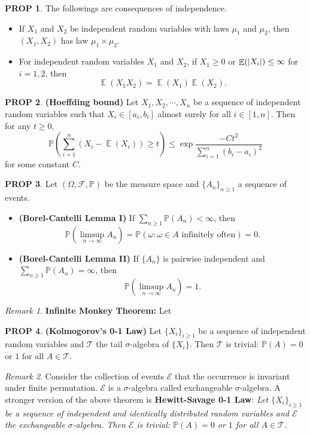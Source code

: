\documentclass[hidelinks,11pt]{article}
\theoremstyle{definition}
\theoremstyle{dotless}
\newtheorem{prop}{PROP}[section]
\theoremstyle{remark}
\newtheorem*{remark}{Remark}
\DeclareMathOperator{\E}{\mathbb{E}}
\DeclareMathOperator{\1}{\mathbf{1}}
\begin{document}
\begin{prop}
The followings are consequences of independence.\begin{itemize}
    \item If $X_1$ and $X_2$ be independent random variables with laws $\mu_1$ and $\mu_2$, then $(X_1,X_2)$ has law $\mu_1\times\mu_2$.
    \item For independent random variables $X_1$ and $X_2$, if $X_1\geq0$ or $\E(\abs{X_i})\leq\infty$ for $i=1,2$, then
    \[\E(X_1X_2)=\E(X_1)\E(X_2).\]
\end{itemize}
\end{prop}

\begin{prop}\textup{\textbf{(Hoeffding bound)}} Let $X_1,X_2,\cdots,X_n$ be a sequence of independent random variables such that $X_i\in[a_i,b_i]$ almost surely for all $i\in[1,n]$. Then for any $t\geq0$,
\[\mathbb{P}\left(\sum_{i=1}^n(X_i-\E(X_i))\geq t\right)\leq\exp{\frac{-Ct^2}{\sum_{i=1}^n(b_i-a_i)^2}}\]
for some constant $C$.
\end{prop}

\begin{prop}Let $(\Omega,\mathcal{F},\mathbb{P})$ be the measure space and $\{A_n\}_{n\geq1}$ a sequence of events.\begin{itemize}
    \item\textup{\textbf{(Borel-Cantelli Lemma I)}} If $\sum_{n\geq1}\mathbb{P}(A_n)<\infty$, then
\[\mathbb{P}(\limsup_{n\to\infty}A_n)=\mathbb{P}(\omega:\omega\in A\textrm{ infinitely often})=0.\]
    \item\textup{\textbf{(Borel-Cantelli Lemma II)}} If $\{A_n\}$ is pairwise independent and $\sum_{n\geq1}\mathbb{P}(A_n)=\infty$, then
    \[\mathbb{P}(\limsup_{n\to\infty}A_n)=1.\]
\end{itemize}
\end{prop}

\begin{remark}\textup{\textbf{Infinite Monkey Theorem:}} Let
\end{remark}

\begin{prop}\textup{\textbf{(Kolmogorov's 0-1 Law)}} Let $\{X_i\}_{i\geq1}$ be a sequence of independent random variables and $\mathcal{T}$ the tail $\sigma$-algebra of $\{X_i\}$. Then $\mathcal{T}$ is trivial: $\mathbb{P}(A)=0$ or $1$ for all $A\in\mathcal{T}$.
\end{prop}

\begin{remark}
Consider the collection of events $\mathcal{E}$ that the occurrence is invariant under finite permutation. $\mathcal{E}$ is a $\sigma$-algebra called exchangeable $\sigma$-algebra. A stronger version of the above theorem is \textbf{Hewitt-Savage 0-1 Law}:\smallbreak
\textit{Let $\{X_i\}_{i\geq1}$ be a sequence of independent and identically distributed random variables and $\mathcal{E}$ the exchangeable $\sigma$-algebra. Then $\mathcal{E}$ is trivial: $\mathbb{P}(A)=0$ or $1$ for all $A\in\mathcal{T}$.}
\end{remark}
\end{document}
